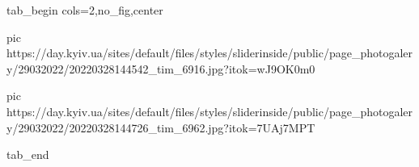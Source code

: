  
 
 
 
 

\ifcmt
  tab_begin cols=2,no_fig,center

     pic https://day.kyiv.ua/sites/default/files/styles/sliderinside/public/page_photogalery/29032022/20220328144542_tim_6916.jpg?itok=wJ9OK0m0

		 pic https://day.kyiv.ua/sites/default/files/styles/sliderinside/public/page_photogalery/29032022/20220328144726_tim_6962.jpg?itok=7UAj7MPT

  tab_end
\fi
